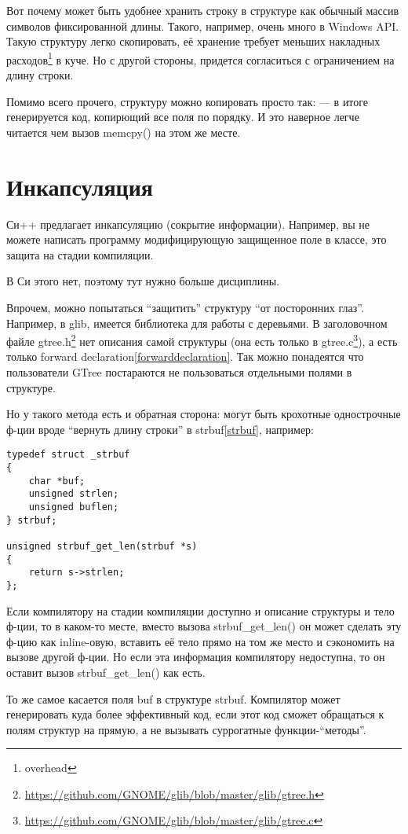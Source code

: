 Вот почему может быть удобнее хранить строку в структуре как обычный массив символов фиксированной длины.
Такого, например, очень много в Windows API. Такую структуру легко скопировать, её хранение
требует меньших накладных расходов\footnote{overhead} в куче. 
Но с другой стороны, придется согласиться с ограничением на длину строки.

Помимо всего прочего, структуру можно копировать просто так:  --- в итоге генерируется код,
копирющий все поля по порядку. И это наверное легче читается чем вызов memcpy() на этом же месте.

\section{Инкапсуляция}

Си++ предлагает инкапсуляцию (сокрытие информации). Например, вы не можете
написать программу модифицирующую защищенное поле в классе, 
это защита на стадии компиляции\cite[1.7.3]{REBook}.

В Си этого нет, поэтому тут нужно больше дисциплины.

Впрочем, можно попытаться ``защитить'' структуру ``от посторонних глаз''. Например, в glib,
имеется библиотека для работы с деревьями. В заголовочном файле 
gtree.h\footnote{\url{https://github.com/GNOME/glib/blob/master/glib/gtree.h}} нет описания самой структуры
(она есть только в gtree.c\footnote{\url{https://github.com/GNOME/glib/blob/master/glib/gtree.c}}), 
а есть только forward declaration\ref{forwarddeclaration}. Так можно понадеятся что
пользователи GTree постараются не пользоваться отдельными полями в структуре.

Но у такого метода есть и обратная сторона: могут быть крохотные однострочные ф-ции вроде 
``вернуть длину строки'' в strbuf\ref{strbuf}, например:

\begin{lstlisting}
typedef struct _strbuf
{
    char *buf;
    unsigned strlen;
    unsigned buflen;
} strbuf;

unsigned strbuf_get_len(strbuf *s)
{
	return s->strlen;
};
\end{lstlisting}

Если компилятору на стадии компиляции доступно и описание структуры и тело ф-ции, то в каком-то месте,
вместо вызова strbuf\_get\_len() он может сделать эту ф-цию как inline-овую, вставить её тело прямо на том
же место и сэкономить на вызове другой ф-ции. Но если эта информация компилятору недоступна, то он
оставит вызов strbuf\_get\_len() как есть.

То же самое касается поля buf в структуре strbuf. Компилятор может генерировать куда более эффективный
код, если этот код сможет обращаться к полям структур на прямую, а не вызывать суррогатные 
функции-``методы''.


